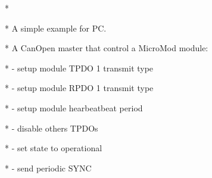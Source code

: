 \documentclass[a4paper,12pt]{book}
\begin{document}
{\ttfamily
*
\space \space \space \space \space \space \space \space \space \space \space \space \space \space \space \space \space \space \space \space \space \space \space \space \space \space \space \space \space \space \space \space \space \space \space \space \space \space \space \space \space \space \space \space \space \space \space \space \space \space \space \space \space \space \space \space \space \space \space *}

{\ttfamily
* \space A simple example for PC.
\space \space \space \space \space \space \space \space \space \space \space \space \space \space \space \space \space \space \space \space \space \space \space \space \space \space \space \space \space \space \space \space \space *}

{\ttfamily
* \space A CanOpen master that control a MicroMod module:
\space \space \space \space \space \space \space \space \space *}

{\ttfamily
* \space {}- setup module TPDO 1 transmit type
\space \space \space \space \space \space \space \space \space \space \space \space \space \space \space \space \space \space \space \space \space \space *}

{\ttfamily
* \space {}- setup module RPDO 1 transmit type
\space \space \space \space \space \space \space \space \space \space \space \space \space \space \space \space \space \space \space \space \space \space *}

{\ttfamily
* \space {}- setup module hearbeatbeat period
\space \space \space \space \space \space \space \space \space \space \space \space \space \space \space \space \space \space \space \space \space \space \space *}

{\ttfamily
* \space {}- disable others TPDOs
\space \space \space \space \space \space \space \space \space \space \space \space \space \space \space \space \space \space \space \space \space \space \space \space \space \space \space \space \space \space \space \space \space \space \space *}

{\ttfamily
* \space {}- set state to operational
\space \space \space \space \space \space \space \space \space \space \space \space \space \space \space \space \space \space \space \space \space \space \space \space \space \space \space \space \space \space \space *}

{\ttfamily
* \space {}- send periodic SYNC
\space \space \space \space \space \space \space \space \space \space \space \space \space \space \space \space \space \space \space \space \space \space \space \space \space \space \space \space \space \space \space \space \space \space \space \space \space *}
\end{document}
